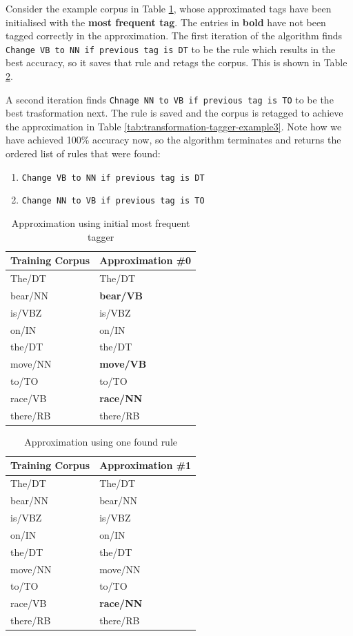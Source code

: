 \documentclass{article}
\begin{document}
Consider the example corpus in Table \ref{tab:transformation-tagger-example1}, whose approximated tags have been initialised with the \textbf{most frequent tag}. The entries in \textbf{bold} have not been tagged correctly in the approximation. The first iteration of the algorithm finds \texttt{Change VB to NN if previous tag is DT} to be the rule which results in the best accuracy, so it saves that rule and retags the corpus. This is shown in  Table \ref{tab:transformation-tagger-example2}.

A second iteration finds \texttt{Chnage NN to VB if previous tag is TO} to be the best trasformation next. The rule is saved and the corpus is retagged to achieve the approximation in Table \ref{tab:transformation-tagger-example3}. Note how we have achieved 100\% accuracy now, so the algorithm terminates and returns the ordered list of rules that were found:
\begin{enumerate}
	\item \texttt{Change VB to NN if previous tag is DT}
	\item \texttt{Change NN to VB if previous tag is TO}
\end{enumerate}

\begin{table}[H]
	\centering
	\begin{tabular}{|l|l|}
		\hline
		\textbf{Training Corpus} & \textbf{Approximation \#0} \\
		\hline
		The/DT & The/DT \\
		bear/NN & \textbf{bear/VB} \\
		is/VBZ & is/VBZ \\
		on/IN & on/IN \\
		the/DT & the/DT \\
		move/NN & \textbf{move/VB} \\
		to/TO & to/TO \\
		race/VB & \textbf{race/NN} \\
		there/RB & there/RB \\
		\hline
	\end{tabular}
	\caption{Approximation using initial most frequent tagger}
	\label{tab:transformation-tagger-example1}
\end{table}

\begin{table}[H]
	\centering
	\begin{tabular}{|l|l|}
		\hline
		\textbf{Training Corpus} & \textbf{Approximation \#1} \\
		\hline
		The/DT & The/DT \\
		bear/NN & bear/NN \\
		is/VBZ & is/VBZ \\
		on/IN & on/IN \\
		the/DT & the/DT \\
		move/NN & move/NN \\
		to/TO & to/TO \\
		race/VB & \textbf{race/NN} \\
		there/RB & there/RB \\
		\hline
	\end{tabular}
	\caption{Approximation using one found rule}
	\label{tab:transformation-tagger-example2}
\end{table}
\end{document}
